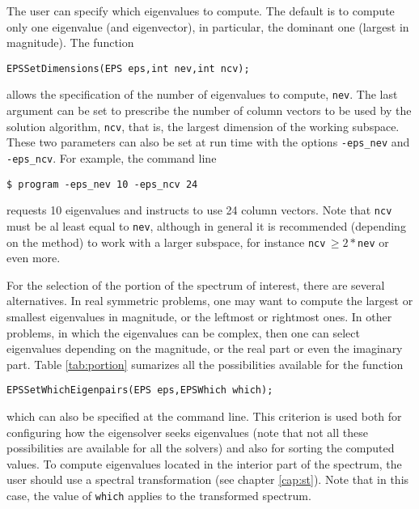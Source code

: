 	The user can specify which eigenvalues to compute. The default is to compute only one eigenvalue (and eigenvector), in particular, the dominant one (largest in magnitude). The function
	\begin{Verbatim}[fontsize=\small]
	EPSSetDimensions(EPS eps,int nev,int ncv);
	\end{Verbatim}
allows the specification of the number of eigenvalues to compute, \texttt{nev}. The last argument can be set to prescribe the number of column vectors to be used by the solution algorithm, \texttt{ncv}, that is, the largest dimension of the working subspace. These two parameters can also be set at run time with the options \Verb!-eps_nev! and \Verb!-eps_ncv!. For example, the command line
\begin{Verbatim}[fontsize=\small]
	$ program -eps_nev 10 -eps_ncv 24
\end{Verbatim}
requests 10 eigenvalues and instructs to use 24 column vectors. Note that \texttt{ncv} must be al least equal to \texttt{nev}, although in general it is recommended (depending on the method) to work with a larger subspace, for instance \texttt{ncv}$\,\geq \!2*$\texttt{nev} or even more.

	For the selection of the portion of the spectrum of interest, there are several alternatives. In real symmetric problems, one may want to compute the largest or smallest eigenvalues in magnitude, or the leftmost or rightmost ones. In other problems, in which the eigenvalues can be complex, then one can select eigenvalues depending on the magnitude, or the real part or even the imaginary part. Table \ref{tab:portion} sumarizes all the possibilities available for the function
	\begin{Verbatim}[fontsize=\small]
	EPSSetWhichEigenpairs(EPS eps,EPSWhich which);
	\end{Verbatim}
which can also be specified at the command line. This criterion is used both for configuring how the eigensolver seeks eigenvalues (note that not all these possibilities are available for all the solvers) and also for sorting the computed values. To compute eigenvalues located in the interior part of the spectrum, the user should use a spectral transformation (see chapter \ref{cap:st}). Note that in this case, the value of \Verb!which! applies to the transformed spectrum.

